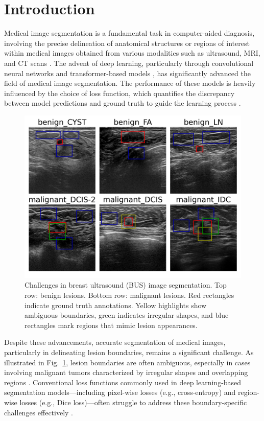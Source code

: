 \documentclass[review]{elsarticle}
\begin{document}
\section{Introduction}\label{introduction}
Medical image segmentation is a fundamental task in computer-aided diagnosis, involving the precise delineation of anatomical structures or regions of interest within medical images obtained from various modalities such as ultrasound, MRI, and CT scans \cite{Du2023}. The advent of deep learning, particularly through convolutional neural networks \cite{Dar2023, Ning2022} and transformer-based models \cite{Kai2023, Zhou2023}, has significantly advanced the field of medical image segmentation. The performance of these models is heavily influenced by the choice of loss function, which quantifies the discrepancy between model predictions and ground truth to guide the learning process \cite{Ansari2024}.

\begin{figure}[H]
    \centering
    \includegraphics[width=\linewidth]{plot_samples.png}
    \caption{Challenges in breast ultrasound (BUS) image segmentation. Top row: benign lesions. Bottom row: malignant lesions. Red rectangles indicate ground truth annotations. Yellow highlights show ambiguous boundaries, green indicates irregular shapes, and blue rectangles mark regions that mimic lesion appearances.}
    \label{fig:challenges}
\end{figure}

Despite these advancements, accurate segmentation of medical images, particularly in delineating lesion boundaries, remains a significant challenge. As illustrated in Fig.~\ref{fig:challenges}, lesion boundaries are often ambiguous, especially in cases involving malignant tumors characterized by irregular shapes and overlapping regions \cite{Noble2006, Dar2024}. Conventional loss functions commonly used in deep learning-based segmentation models—including pixel-wise losses (e.g., cross-entropy) and region-wise losses (e.g., Dice loss)—often struggle to address these boundary-specific challenges effectively \cite{Lin2024}. 
\end{document}
